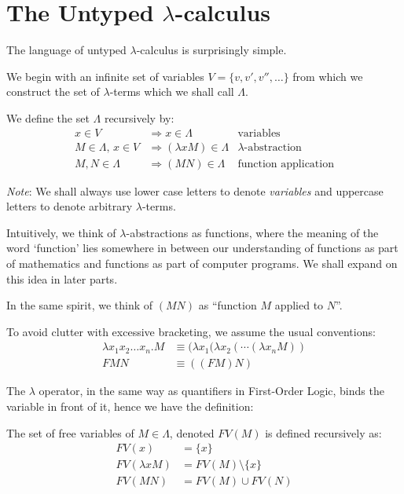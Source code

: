 \section{The Untyped $\lambda$-calculus}


The language of untyped $\lambda$-calculus is surprisingly simple.

We begin with an infinite set of variables $V = \{v, v', v'', \ldots\}$ from
which we construct the set of $\lambda$-terms which we shall call $\Lambda$.

\begin{definition}\label{def:untyped-lambda-calc}
We define the set $\Lambda$ recursively by:
\begin{align*}
    x \in V & \Rightarrow x \in \Lambda &
        \text{variables} \\
    M \in \Lambda,\, x \in V & \Rightarrow (\lambda x M) \in \Lambda &
        \text{$\lambda$-abstraction} \\
    M, N \in \Lambda & \Rightarrow (M N) \in \Lambda &
        \text{function application}
\end{align*}
\end{definition}

\emph{Note}: We shall always use lower case letters to denote \emph{variables} and
uppercase letters to denote arbitrary $\lambda$-terms.

Intuitively, we think of $\lambda$-abstractions as functions, where the meaning
of the word `function' lies somewhere in between our understanding of functions as
part of mathematics and functions as part of computer programs. We shall expand
on this idea in later parts.

In the same spirit, we think of $(M N)$ as ``function $M$ applied to $N$''.

To avoid clutter with excessive bracketing, we assume the usual conventions:
\begin{align*}
    \lambda x_1 x_2 \ldots x_n . M &\equiv
        (\lambda x_1 (\lambda x_2 (\cdots (\lambda x_n M)) \\
    F M N &\equiv ((FM)N)
\end{align*}

The $\lambda$ operator, in the same way as quantifiers in First-Order Logic,
binds the variable in front of it, hence we have the definition:
\begin{definition}
    The set of free variables of $M \in \Lambda$, denoted $FV(M)$ is defined
    recursively as:
        \begin{align*}
            FV(x) &= \{x\} \\
            FV(\lambda x M) &= FV(M) \setminus \{x\} \\
            FV(M N) &= FV(M) \cup FV(N)
        \end{align*}
\end{definition}

